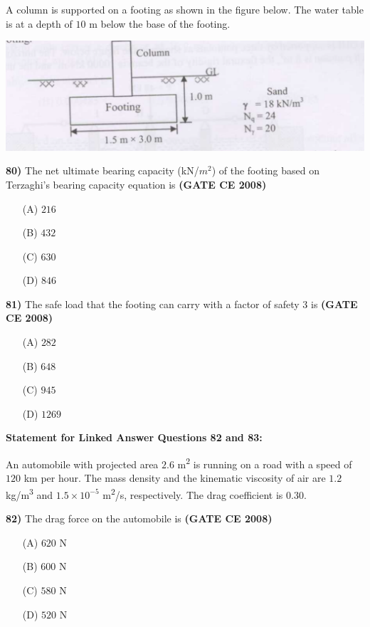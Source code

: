 \documentclass[journal]{IEEEtran}
\begin{document}
\begin{enumerate}
A column is supported on a footing as shown in the figure below. The water table is at a depth of $10$ m below the base of the footing.

\vspace{0.3cm}
\includegraphics[width=\textwidth]{image/image13.png} 
\vspace{0.3cm}

\textbf{80)} The net ultimate bearing capacity (kN/$m^{2}$) of the footing based on Terzaghi's bearing capacity equation is \textbf{(GATE CE 2008)}
\begin{itemize}
    \item[(A)] $216$
    \item[(B)] $432$
    \item[(C)] $630$
    \item[(D)] $846$
\end{itemize}

\textbf{81)} The safe load  that the footing can carry with a factor of safety $3$ is \textbf{(GATE CE 2008)}
\begin{itemize}
    \item[(A)] $282$
    \item[(B)] $648$
    \item[(C)] $945$
    \item[(D)] $1269$
\end{itemize}

\vspace{0.5cm}
\textbf{Statement for Linked Answer Questions 82 and 83:}

An automobile with projected area $2.6$ m\textsuperscript{2} is running on a road with a speed of $120$ km per hour. The mass density and the kinematic viscosity of air are $1.2$ kg/m\textsuperscript{3} and $1.5 \times 10^{-5}$ m\textsuperscript{2}/s, respectively. The drag coefficient is $0.30$.

\textbf{82)} The drag force on the automobile is \textbf{(GATE CE 2008)}
\begin{itemize}
    \item[(A)] $620$ N
    \item[(B)] $600$ N
    \item[(C)] $580$ N
    \item[(D)] $520$ N
\end{itemize}


\end{enumerate}
\end{document}
